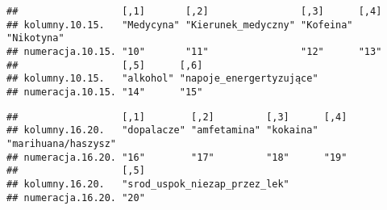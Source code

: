 \documentclass[]{article}
\begin{document}
\begin{verbatim}
##                  [,1]       [,2]                [,3]      [,4]      
## kolumny.10.15.   "Medycyna" "Kierunek_medyczny" "Kofeina" "Nikotyna"
## numeracja.10.15. "10"       "11"                "12"      "13"      
##                  [,5]      [,6]                    
## kolumny.10.15.   "alkohol" "napoje_energertyzujące"
## numeracja.10.15. "14"      "15"
\end{verbatim}

\begin{verbatim}
##                  [,1]        [,2]         [,3]      [,4]               
## kolumny.16.20.   "dopalacze" "amfetamina" "kokaina" "marihuana/haszysz"
## numeracja.16.20. "16"        "17"         "18"      "19"               
##                  [,5]                         
## kolumny.16.20.   "srod_uspok_niezap_przez_lek"
## numeracja.16.20. "20"
\end{verbatim}
\end{document}
